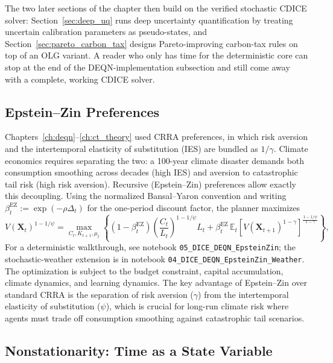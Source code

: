 \documentclass[11pt,a4paper]{report}
\begin{document}
The two later sections of the chapter then build on the verified stochastic CDICE solver: Section~\ref{sec:deep_uq} runs deep uncertainty quantification by treating uncertain calibration parameters as pseudo-states, and Section~\ref{sec:pareto_carbon_tax} designs Pareto-improving carbon-tax rules on top of an OLG variant.  A reader who only has time for the deterministic core can stop at the end of the DEQN-implementation subsection and still come away with a complete, working CDICE solver.

\subsection{Epstein--Zin Preferences}

Chapters~\ref{ch:deqn}--\ref{ch:ct_theory} used CRRA preferences, in which risk aversion and the intertemporal elasticity of substitution (IES) are bundled as $1/\gamma$.  Climate economics requires separating the two: a 100-year climate disaster demands both consumption smoothing across decades (high IES) and aversion to catastrophic tail risk (high risk aversion).  Recursive (Epstein--Zin) preferences allow exactly this decoupling.  Using the normalized Bansal--Yaron convention and writing $\beta^{\mathrm{EZ}}_t := \exp(-\rho \Delta_t)$ for the one-period discount factor, the planner maximizes
\begin{equation}
V(\bm{X}_t)^{1-1/\psi} = \max_{C_t, K_{t+1}, \mu_t}\left\{(1-\beta^{\mathrm{EZ}}_t)\left(\frac{C_t}{L_t}\right)^{1-1/\psi} L_t + \beta^{\mathrm{EZ}}_t\,\mathbb{E}_t\!\left[V(\bm{X}_{t+1})^{1-\gamma}\right]^{\frac{1-1/\psi}{1-\gamma}}\right\},
\label{eq:ez_iam}
\end{equation}
For a deterministic walkthrough, see notebook \texttt{05\_DICE\_DEQN\_EpsteinZin}; the stochastic-weather extension is in notebook \texttt{04\_DICE\_DEQN\_EpsteinZin\_Weather}.  The optimization is subject to the budget constraint, capital accumulation, climate dynamics, and learning dynamics.  The key advantage of Epstein--Zin over standard CRRA is the separation of risk aversion ($\gamma$) from the intertemporal elasticity of substitution ($\psi$), which is crucial for long-run climate risk where agents must trade off consumption smoothing against catastrophic tail scenarios.

\subsection{Nonstationarity: Time as a State Variable}
\end{document}
